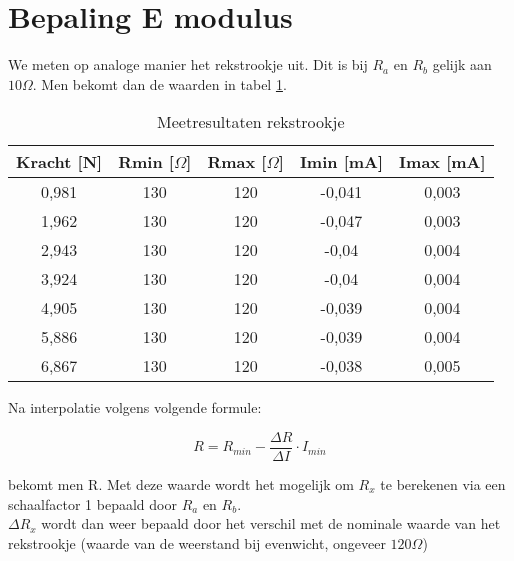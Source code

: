 \section{Bepaling E modulus}

We meten op analoge manier het rekstrookje uit.
Dit is bij $R_a$ en $R_b$ gelijk aan $10\Omega$. 
Men bekomt dan de waarden in tabel \ref{tab:rekstrookje}.

\begin{table}[h]
    \centering
    \caption{Meetresultaten rekstrookje}
    \label{tab:rekstrookje}

    \begin{tabular}{| c | c | c | c | c |}
        \hline
        Kracht [N] & Rmin [$\Omega$]   & Rmax [$\Omega$]   & Imin [mA] & Imax [mA] \\ \hline
        0,981      & 130               & 120               & -0,041    & 0,003 \\ \hline
        1,962      & 130               & 120               &-0,047     & 0,003 \\ \hline
        2,943      & 130               & 120               &-0,04      & 0,004 \\ \hline
        3,924      & 130               & 120               &-0,04      & 0,004 \\ \hline
        4,905      & 130               & 120               &-0,039     & 0,004 \\ \hline
        5,886      & 130               & 120               &-0,039     & 0,004 \\ \hline
        6,867      & 130               & 120               &-0,038     & 0,005 \\ \hline
    \end{tabular}
\end{table}

Na interpolatie volgens volgende formule:

\begin{equation}
    R = R_{min} - \frac{\Delta R}{\Delta I} \cdot I_{min}
\end{equation}


bekomt men R. Met deze waarde wordt het mogelijk om $R_{x}$ te
berekenen via een schaalfactor 1 bepaald door $R_{a}$ en $R_{b}$.
\\

$\Delta R_{x}$ wordt dan weer bepaald door het verschil met de
nominale waarde van het rekstrookje (waarde van de weerstand
bij evenwicht, ongeveer $120\Omega$)
\\

